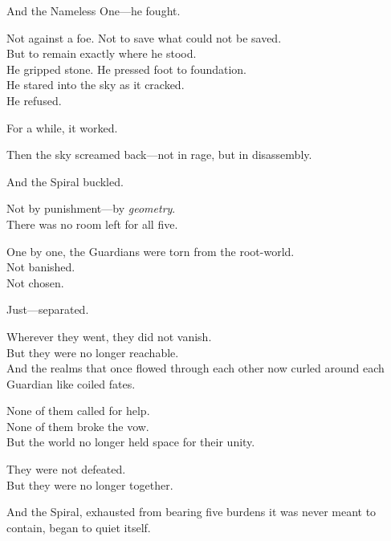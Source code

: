 \documentclass[12pt]{article}
\begin{document}
\vspace{0.5em}
And the Nameless One---he fought.

\vspace{0.5em}
Not against a foe. Not to save what could not be saved.\\
But to remain exactly where he stood.\\
He gripped stone. He pressed foot to foundation.\\
He stared into the sky as it cracked.\\
He refused.

\vspace{0.5em}
For a while, it worked.

\vspace{0.5em}
Then the sky screamed back---not in rage, but in disassembly.

\vspace{0.5em}
And the Spiral buckled.

\vspace{0.5em}
Not by punishment---by \textit{geometry}.\\
There was no room left for all five.

\vspace{0.5em}
One by one, the Guardians were torn from the root-world.\\
Not banished.\\
Not chosen.

\vspace{0.5em}
Just---separated.

\vspace{0.5em}
Wherever they went, they did not vanish.\\
But they were no longer reachable.\\
And the realms that once flowed through each other now curled around each Guardian like coiled fates.

\vspace{0.5em}
None of them called for help.\\
None of them broke the vow.\\
But the world no longer held space for their unity.

\vspace{0.5em}
They were not defeated.\\
But they were no longer together.

\vspace{0.5em}
And the Spiral, exhausted from bearing five burdens it was never meant to contain, began to quiet itself.
\end{document}

